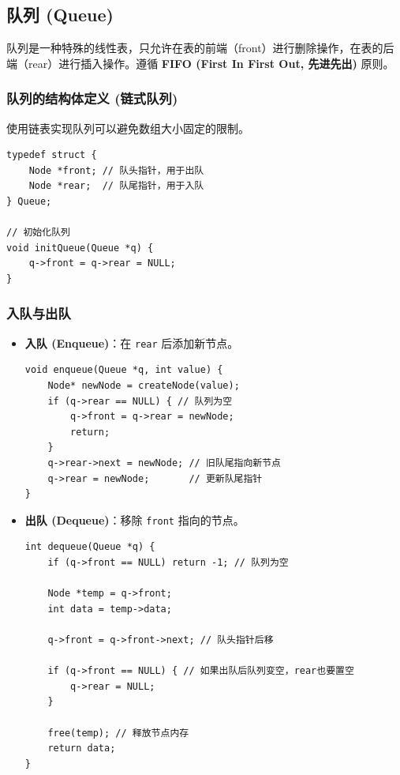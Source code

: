 \documentclass[a4paper,12pt]{article}
\begin{document}
\subsection{队列 (Queue)}
队列是一种特殊的线性表，只允许在表的前端（front）进行删除操作，在表的后端（rear）进行插入操作。遵循 \textbf{FIFO (First In First Out, 先进先出)} 原则。

\subsubsection{队列的结构体定义 (链式队列)}
使用链表实现队列可以避免数组大小固定的限制。

\begin{lstlisting}[style=mystyle]
typedef struct {
    Node *front; // 队头指针，用于出队
    Node *rear;  // 队尾指针，用于入队
} Queue;

// 初始化队列
void initQueue(Queue *q) {
    q->front = q->rear = NULL;
}
\end{lstlisting}

\subsubsection{入队与出队}
\begin{itemize}
    \item \textbf{入队 (Enqueue)}：在 \texttt{rear} 后添加新节点。
    \begin{lstlisting}[style=mystyle]
void enqueue(Queue *q, int value) {
    Node* newNode = createNode(value);
    if (q->rear == NULL) { // 队列为空
        q->front = q->rear = newNode;
        return;
    }
    q->rear->next = newNode; // 旧队尾指向新节点
    q->rear = newNode;       // 更新队尾指针
}
    \end{lstlisting}

    \item \textbf{出队 (Dequeue)}：移除 \texttt{front} 指向的节点。
    \begin{lstlisting}[style=mystyle]
int dequeue(Queue *q) {
    if (q->front == NULL) return -1; // 队列为空

    Node *temp = q->front;
    int data = temp->data;
    
    q->front = q->front->next; // 队头指针后移
    
    if (q->front == NULL) { // 如果出队后队列变空，rear也要置空
        q->rear = NULL;
    }
    
    free(temp); // 释放节点内存
    return data;
}
    \end{lstlisting}
\end{itemize}
\end{document}
